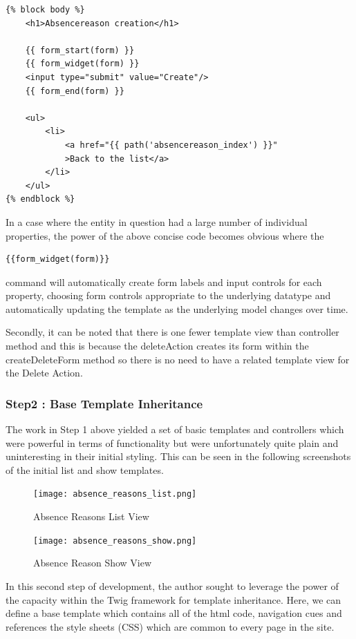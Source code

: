 \documentclass[a4paper,12pt]{article}
\begin{document}
\begin{verbatim}
{% block body %}
    <h1>Absencereason creation</h1>

    {{ form_start(form) }}
    {{ form_widget(form) }}
    <input type="submit" value="Create"/>
    {{ form_end(form) }}

    <ul>
        <li>
            <a href="{{ path('absencereason_index') }}"
            >Back to the list</a>
        </li>
    </ul>
{% endblock %}
\end{verbatim}
In a case where the entity in question had a large number of individual properties, the power of the above concise code becomes obvious where the \begin{verbatim}{{form_widget(form)}} \end{verbatim} command will automatically create form labels and input controls for each property, choosing form controls appropriate to the underlying datatype and automatically updating the template as the underlying model changes over time.

Secondly, it can be noted that there is one fewer template view than controller method and this is because the deleteAction creates its form within the createDeleteForm method so there is no need to have a related template view for the Delete Action.

\subsubsection {Step2 : Base Template Inheritance}

The work in Step 1 above yielded a set of basic templates and controllers which were powerful in terms of functionality but were unfortunately quite plain and uninteresting in their initial styling.  This can be seen in the following screenshots of the initial list and show templates.


 \begin{figure}[h!]
\texttt{[image: absence\_reasons\_list.png]}
  \caption{Absence Reasons List View}
  \label{fig:Absence Reasons List View}
\end{figure}


 \begin{figure}[h!]
\texttt{[image: absence\_reasons\_show.png]}
  \caption{Absence Reason Show View}
  \label{fig:Absence Reason Show View}
\end{figure}


In this second step of development, the author sought to leverage the power of the  capacity within the Twig framework for template inheritance. Here, we can define a base template which contains all of the html code, navigation cues and references the style sheets (CSS) which are common to every page in the site.
\end{document}
